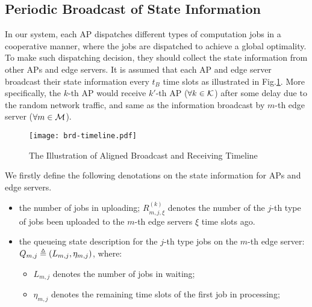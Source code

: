 
\subsection{Periodic Broadcast of State Information}
In our system, each AP dispatches different types of computation jobs in a cooperative manner, where the jobs are dispatched to achieve a global optimality.
To make such dispatching decision, they should collect the state information from other APs and edge servers.
It is assumed that each AP and edge server broadcast their state information every $t_B$ time slots as illustrated in Fig.\ref{fig:brd-timeline}.
More specifically, the $k$-th AP would receive $k'$-th AP ($\forall k\in\mathcal{K}$) after some delay due to the random network traffic, and same as the information broadcast by $m$-th edge server ($\forall m\in\mathcal{M}$).
\begin{figure}[ht]
    \centering
    \texttt{[image: brd-timeline.pdf]}
    \caption{The Illustration of Aligned Broadcast and Receiving Timeline}
    \label{fig:brd-timeline}
\end{figure}

We firstly define the following denotations on the state information for APs and edge servers.

\begin{itemize}
    \item the number of jobs in uploading;
        $R^{(k)}_{m,j,\xi}$ denotes the number of the $j$-th type of jobs been uploaded to the $m$-th edge servers $\xi$ time slots ago.
    \item the queueing state description for the $j$-th type jobs on the $m$-th edge server: $Q_{m,j} \triangleq (L_{m,j}, \eta_{m,j})$, where:
    \begin{itemize}
        \item $L_{m,j}$ denotes the number of jobs in waiting;
        \item $\eta_{m,j}$ denotes the remaining time slots of the first job in processing;
    \end{itemize}
\end{itemize}


